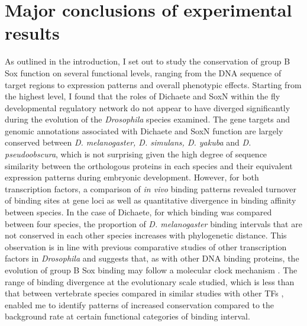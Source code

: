 \section{Major conclusions of experimental results} 
As outlined in the introduction, I set out to study the conservation of group B Sox function on several functional levels, ranging from the DNA sequence of target regions to expression patterns and overall phenotypic effects. Starting from the highest level, I found that the roles of Dichaete and SoxN within the fly developmental regulatory network do not appear to have diverged significantly during the evolution of the \emph{Drosophila} species examined. The gene targets and genomic annotations associated with Dichaete and SoxN function are largely conserved between \emph{D. melanogaster, D. simulans, D. yakuba} and \emph{D. pseudoobscura}, which is not surprising given the high degree of sequence similarity between the orthologous proteins in each species and their equivalent expression patterns during embryonic development. However, for both transcription factors, a comparison of \emph{in vivo} binding patterns revealed turnover of binding sites at gene loci as well as quantitative divergence in binding affinity between species. In the case of Dichaete, for which binding was compared between four species, the proportion of \emph{D. melanogaster} binding intervals that are not conserved in each other species increases with phylogenetic distance. This observation is in line with previous comparative studies of other transcription factors in \emph{Drosophila} and suggests that, as with other DNA binding proteins, the evolution of group B Sox binding may follow a molecular clock mechanism \citep{bradley_binding_2010,he_high_2011,paris_extensive_2013}. The range of binding divergence at the evolutionary scale studied, which is less than that between vertebrate species compared in similar studies with other TFs \citep{odom_tissue-specific_2007,schmidt_five-vertebrate_2010,stefflova_cooperativity_2013,villar_evolution_2014}, enabled me to identify patterns of increased conservation compared to the background rate at certain functional categories of binding interval.\\

